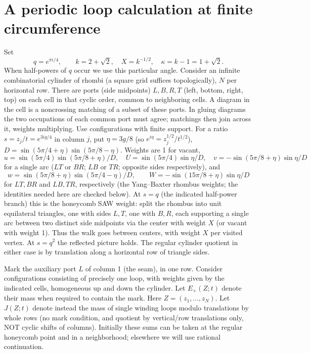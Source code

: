 \section{A periodic loop calculation at finite circumference}\label{L:part1}

Set
\[
 q=e^{\pi i/4},\qquad k=2+\sqrt2,\quad X=k^{-1/2},
 \quad \kappa=k-1=1+\sqrt2 .
\]
When half-powers of \(q\) occur we use this particular angle. Consider an infinite combinatorial cylinder of rhombi (a square grid suffices topologically), \(N\) per horizontal row. There are ports (side midpoints) \(L,B,R,T\) (left, bottom, right, top) on each cell in that cyclic order, common to neighboring cells. A diagram in the cell is a noncrossing matching of a subset of these ports. In gluing diagrams the two occupations of each common port must agree; matchings then join across it, weights multiplying. Use configurations with finite support. For a ratio \(s=z_j/t=e^{3ig/4}\) in column \(j\), put \(\eta=3g/8\) (so \(e^{i\eta}=z_j^{1/2}/t^{1/2}\)), \(D=\sin(5\pi/4+\eta)\sin(5\pi/8-\eta)\). Weights are 1 for vacant,
\[
 u=\sin(5\pi/4)\sin(5\pi/8+\eta)/D,\quad
 U=\sin(5\pi/4)\sin\eta/D,\quad
 v=-\sin(5\pi/8+\eta)\sin\eta/D
\]
for a single arc (\(LT\) or \(BR\); \(LB\) or \(TR\); opposite sides respectively), and
\[
 w=\sin(5\pi/8+\eta)\sin(5\pi/4-\eta)/D,\qquad
 W=-\sin(15\pi/8+\eta)\sin\eta/D
\]
for \(LT,BR\) and \(LB,TR\), respectively (the Yang--Baxter rhombus weights; the identities needed here are checked below). At \(s=q\) (the indicated half-power branch) this is the honeycomb SAW weight: split the rhombus into unit equilateral triangles, one with sides \(L,T\), one with \(B,R\), each supporting a single arc between two distinct side midpoints via the center with weight \(X\) (or vacant with weight 1). Thus the walk goes between centers, with weight \(X\) per visited vertex. At \(s=q^2\) the reflected picture holds. The regular cylinder quotient in either case is by translation along a horizontal row of triangle sides. \cite{GlazmanManolescu2017}

Mark the auxiliary port \(L\) of column 1 (the seam), in one row. Consider configurations consisting of precisely one loop, with weights given by the indicated cells, homogeneous up and down the cylinder. Let \(E_+(Z;t)\) denote their mass when required to contain the mark. Here \(Z=(z_1,\ldots,z_N)\). Let \(J(Z;t)\) denote instead the mass of single winding loops modulo translations by whole rows (no mark condition, and quotient by vertical/row translations only, NOT cyclic shifts of columns). Initially these sums can be taken at the regular honeycomb point and in a neighborhood; elsewhere we will use rational continuation.

